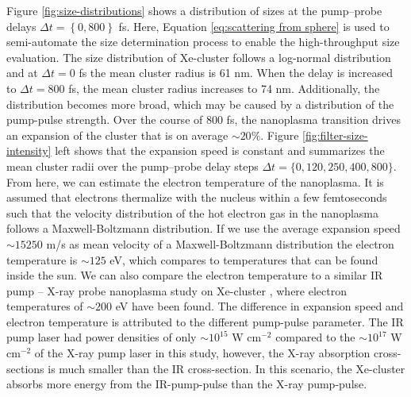 Figure \ref{fig:size-distributions} shows a distribution of sizes at the pump--probe delays $\Delta t = \left\{0,800\right\}$ fs. Here, Equation \eqref{eq:scattering from sphere} is used to semi-automate the size determination process to enable the high-throughput size evaluation. The size distribution of Xe-cluster follows a log-normal distribution \citep{Schutte-2002-IJMS} and at $\Delta t=0$ fs the mean cluster radius is 61 nm. When the delay is increased to $\Delta t=800$ fs, the mean cluster radius increases to 74 nm. Additionally, the distribution becomes more broad, which may be caused by a distribution of the pump-pulse strength. Over the course of 800 fs, the nanoplasma transition drives an expansion of the cluster that is on average $\sim 20 \%$. Figure \ref{fig:filter-size-intensity} left shows that the expansion speed is constant and summarizes the mean cluster radii over the pump--probe delay steps $\Delta t=\{0,120,250,400,800\}$. From here, we can estimate the electron temperature of the nanoplasma. It is assumed that electrons thermalize with the nucleus within a few femtoseconds such that the velocity distribution of the hot electron gas in the nanoplasma follows a Maxwell-Boltzmann distribution. If we use the average expansion speed $\sim 15250$ m/s as mean velocity of a Maxwell-Boltzmann distribution the electron temperature is $\sim 125$ eV, which compares to temperatures that can be found inside the sun. We can also compare the electron temperature to a similar IR pump -- X-ray probe nanoplasma study on Xe-cluster \citep{Gorkhover-2016-NatPho}, where electron temperatures of $\sim 200$ eV have been found. The difference in expansion speed and electron temperature is attributed to the different pump-pulse parameter. The IR pump laser had power densities of only $\sim 10^{15}$ W cm$^{-2}$ compared to the $\sim 10^{17}$ W cm$^{-2}$ of the X-ray pump laser in this study, however, the X-ray absorption cross-sections is much smaller than the IR cross-section. In this scenario, the Xe-cluster absorbs more energy from  the IR-pump-pulse than the X-ray pump-pulse.\\
